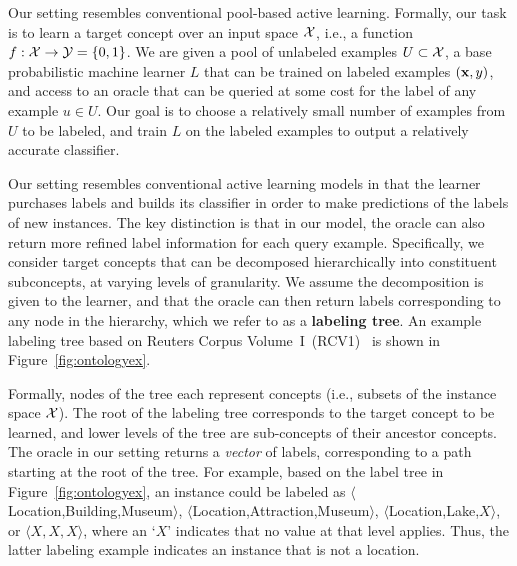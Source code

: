 \documentclass[10pt, conference, compsocconf]{IEEEtran}
\begin{document}
Our setting resembles conventional pool-based active learning.
Formally, our task is to learn a target concept over an input space ${\cal X}$,
i.e., a 
function $f : {\cal X} \rightarrow {\cal Y}=\{0, 1\}$.  We are given a pool of 
unlabeled examples $U \subset {\cal X}$, a base probabilistic machine learner $L$ that can
be trained on labeled examples $({\bf x}, y)$, and
access to an oracle that can be queried at some cost for the label of any example $u \in U$.
Our goal is to choose a relatively small number of examples from $U$ to be labeled, 
and train $L$ on the labeled examples to output a relatively accurate classifier.

Our setting resembles conventional active learning models in that the learner
purchases labels and builds its classifier in order to make predictions of the labels of new 
instances.  The key distinction is that in our model, the oracle can also return
more refined label information for each query example.  Specifically, we consider target
concepts that can be decomposed hierarchically into constituent subconcepts,
at varying levels of granularity.  We assume the decomposition is given
to the learner, and that the oracle can then return labels corresponding to any
node in the hierarchy, which we refer to as a {\bf labeling tree}.  An
example labeling tree based on Reuters Corpus Volume~I~(RCV1)~\cite{Lewis2004}
is shown in Figure~\ref{fig:ontologyex}.

Formally, nodes of the tree each represent concepts (i.e., subsets of the instance space ${\cal X}$).
The root of the labeling tree corresponds to the target concept to be learned, and lower 
levels of the tree are sub-concepts of their ancestor concepts.  The oracle in our
setting returns a {\it vector} of labels, corresponding to a path starting at the root of the tree.
For example, based on the label tree in
Figure~\ref{fig:ontologyex}, an instance could be labeled as
$\langle$Location,Building,Museum$\rangle$,  $\langle$Location,Attraction,Museum$\rangle$,
$\langle$Location,Lake,$X\rangle$, or $\langle X,X,X \rangle$, where an `$X$' indicates
that no value at that level applies.
Thus, the latter labeling example indicates an instance that is not a location.
\end{document}
